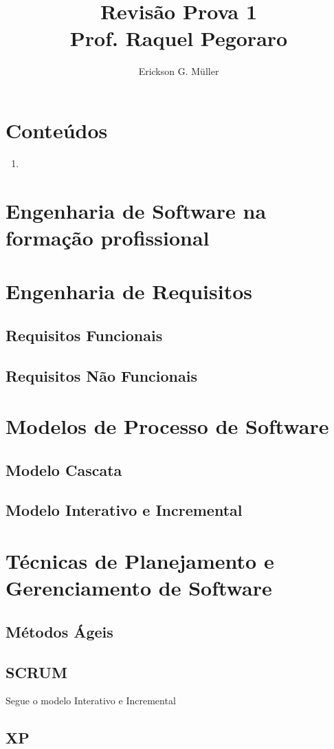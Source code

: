 \documentclass[ ]{article}
\title{Revisão Prova 1\\ Prof. Raquel Pegoraro}
\author{Erickson G. Müller}
\begin{document}
	\maketitle
	\newpage
	\section*{Conteúdos}
		\begin{enumerate}
			\item 
		\end{enumerate}
	\section{Engenharia de Software na formação profissional}
	\section{Engenharia de Requisitos}
		\subsection{Requisitos Funcionais}			
		\subsection{Requisitos Não Funcionais}
	\section{Modelos de Processo de Software}
		\subsection{Modelo Cascata}
		\subsection{Modelo Interativo e Incremental}
	\section{Técnicas de Planejamento e Gerenciamento de Software}
		\subsection{Métodos Ágeis}
		\subsection{SCRUM}
			Segue o modelo Interativo e Incremental
		\subsection{XP}
\end{document}
